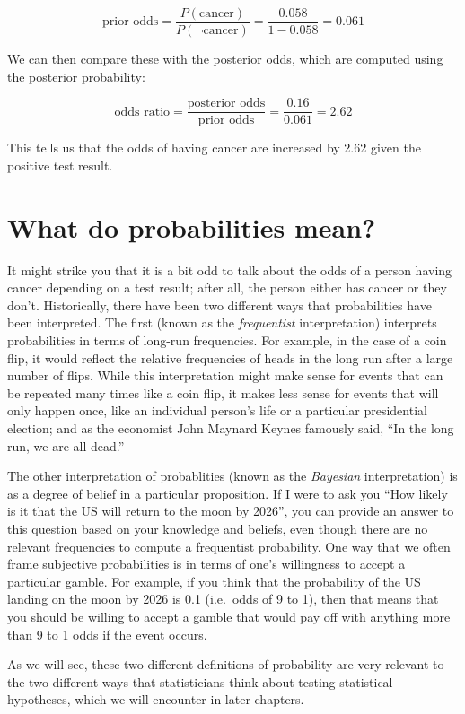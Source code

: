\documentclass[]{book}
\theoremstyle{definition}
\theoremstyle{definition}
\theoremstyle{definition}
\theoremstyle{remark}
\begin{document}
\[
\text{prior odds} = \frac{P(\text{cancer})}{P(\neg \text{cancer})} =\frac{0.058}{1 - 0.058} = 0.061
\]

We can then compare these with the posterior odds, which are computed
using the posterior probability:

\[
\text{odds ratio} = \frac{\text{posterior odds}}{\text{prior odds}} = \frac{0.16}{0.061} = 2.62
\]

This tells us that the odds of having cancer are increased by 2.62 given
the positive test result.

\section{What do probabilities mean?}\label{what-do-probabilities-mean}

It might strike you that it is a bit odd to talk about the odds of a
person having cancer depending on a test result; after all, the person
either has cancer or they don't. Historically, there have been two
different ways that probabilities have been interpreted. The first
(known as the \emph{frequentist} interpretation) interprets
probabilities in terms of long-run frequencies. For example, in the case
of a coin flip, it would reflect the relative frequencies of heads in
the long run after a large number of flips. While this interpretation
might make sense for events that can be repeated many times like a coin
flip, it makes less sense for events that will only happen once, like an
individual person's life or a particular presidential election; and as
the economist John Maynard Keynes famously said, ``In the long run, we
are all dead.''

The other interpretation of probablities (known as the \emph{Bayesian}
interpretation) is as a degree of belief in a particular proposition. If
I were to ask you ``How likely is it that the US will return to the moon
by 2026'', you can provide an answer to this question based on your
knowledge and beliefs, even though there are no relevant frequencies to
compute a frequentist probability. One way that we often frame
subjective probabilities is in terms of one's willingness to accept a
particular gamble. For example, if you think that the probability of the
US landing on the moon by 2026 is 0.1 (i.e.~odds of 9 to 1), then that
means that you should be willing to accept a gamble that would pay off
with anything more than 9 to 1 odds if the event occurs.

As we will see, these two different definitions of probability are very
relevant to the two different ways that statisticians think about
testing statistical hypotheses, which we will encounter in later
chapters.
\end{document}
